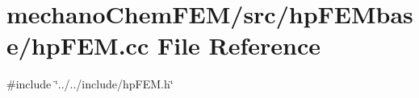 \section{mechano\+Chem\+F\+E\+M/src/hp\+F\+E\+Mbase/hp\+F\+EM.cc File Reference}
\label{hp_f_e_m_8cc}
{\ttfamily \#include \char`\"{}../../include/hp\+F\+E\+M.\+h\char`\"{}}\newline
